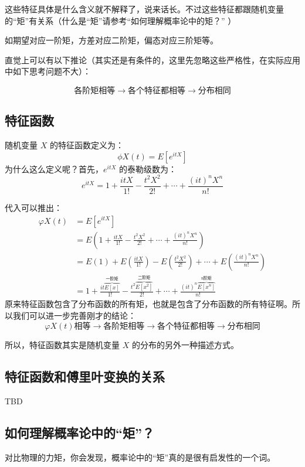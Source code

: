 \documentclass[12pt]{article}
\begin{document}
这些特征具体是什么含义就不解释了，说来话长。不过这些特征都跟随机变量的“矩”有关系（什么是“矩”请参考“如何理解概率论中的矩？” ）

如期望对应一阶矩，方差对应二阶矩，偏态对应三阶矩等。

直觉上可以有以下推论（其实还是有条件的，这里先忽略这些严格性，在实际应用中如下思考问题不大）：

$$
\textbf{各阶矩相等} \rightarrow \textbf{各个特征都相等} \rightarrow \textbf{分布相同} 
$$

\subsection{特征函数}
随机变量 $X$ 的特征函数定义为：
$$
\phi X(t) = E[e^{itX}]
$$
为什么这么定义呢？首先，$e^{itX}$ 的泰勒级数为：
$$
e^{itX} = 1 + \frac{itX}{1!} - \frac{t^2X^2}{2!} + \cdots + \frac{(it)^nX^n}{n!}
$$

代入可以推出：
\begin{align}
\varphi X(t) &= E[e^{itX}] \\
&= E(1 + \frac{itX}{1!} - \frac{t^2X^2}{2!} + \cdots + \frac{(it)^nX^n}{n!}) \\
&= E(1) + E(\frac{itX}{1!}) - E(\frac{t^2X^2}{2!}) + \cdots + E(\frac{(it)^nX^n}{n!}) \\
&= 1 + \frac{it\overbrace{E[x]}^{\text{一阶矩}}}{1!} - \frac{t^2\overbrace{E[x^2]}^{\text{二阶矩}}}{2!} + \cdots +  \frac{(it)^n\overbrace{E[x^n]}^{\text{n阶矩}}}{n!} 
\end{align}
原来特征函数包含了分布函数的所有矩，也就是包含了分布函数的所有特征啊。所以我们可以进一步完善刚才的结论：
$$
\varphi X(t) \textbf{相等} \rightarrow \textbf{各阶矩相等} \rightarrow \textbf{各个特征都相等} \rightarrow \textbf{分布相同} 
$$

所以，特征函数其实是随机变量 $X$ 的分布的另外一种描述方式。

\subsection{特征函数和傅里叶变换的关系\cite{Understand_Feature_Function}}
TBD

\subsection{如何理解概率论中的“矩”？\cite{Understand_Moment_In_Prob}}
对比物理的力矩，你会发现，概率论中的“矩”真的是很有启发性的一个词。
\end{document}
